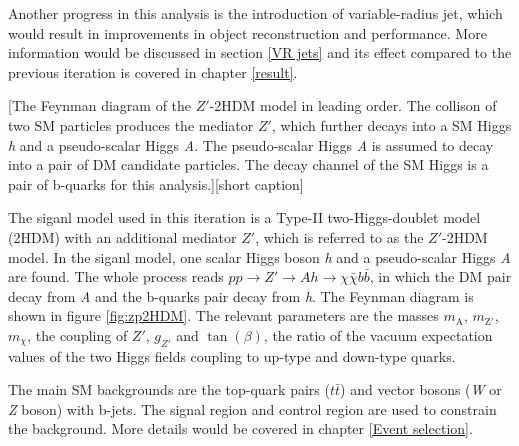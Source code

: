\documentclass[class=NCU_thesis, crop=false]{standalone}
\begin{document}
	Another progress in this analysis is the introduction of variable-radius jet, which would result in improvements in object reconstruction and performance. More information would be discussed in section \ref{VR jets} and its effect compared to the previous iteration is covered in chapter \ref{result}.
	
	[The Feynman diagram of the $Z'$-2HDM model in leading order. The collison of two SM particles produces the mediator $Z'$, which further decays into a SM Higgs \textit{h} and a pseudo-scalar Higgs \textit{A}. The pseudo-scalar Higgs \textit{A} is assumed to decay into a pair of DM candidate particles. The decay channel of the SM Higgs is a pair of b-quarks for this analysis.][short caption]
	
	The siganl model used in this iteration is a Type-II two-Higgs-doublet model (2HDM) \cite{1707.01302} with an additional mediator $Z'$, which is referred to as the $Z'$-2HDM model. In the siganl model, one scalar Higgs boson \textit{h} and a pseudo-scalar Higgs \textit{A} are found. The whole process reads $pp \rightarrow Z' \rightarrow Ah \rightarrow \chi \bar{\chi} b \bar{b}$, in which the DM pair decay from \textit{A} and the b-quarks pair decay from \textit{h}. The Feynman diagram is shown in figure \ref{fig:zp2HDM}. The relevant parameters are the masses $m_{\mathrm{A}}$, $m_{\mathrm{Z'}}$, $m_{\chi}$, the coupling of $Z'$, $g_{Z'}$ and $\tan(\beta)$, the ratio of the vacuum expectation values of the two Higgs fields coupling to up-type and down-type quarks.
	
	The main SM backgrounds are the top-quark pairs ($t\bar{t}$) and vector bosons (\textit{W} or \textit{Z} boson) with b-jets. The signal region and control region are used to constrain the background. More details would be covered in chapter \ref{Event selection}.
	
\end{document}
